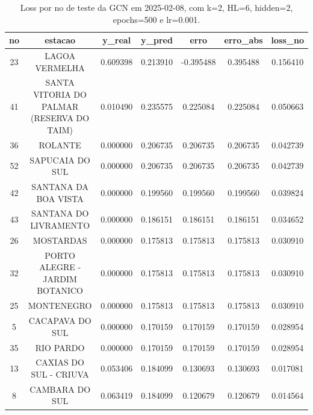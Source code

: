 \begin{table}[h]
\centering
\caption{Loss por no de teste da GCN em 2025-02-08, com k=2, HL=6, hidden=2, epochs=500 e lr=0.001.}
\label{tab:gcn_loss_k2_hl6_h2_e500_d20250208}
\begin{tabular}{ccccccc}
\toprule
no & estacao & y\_real & y\_pred & erro & erro\_abs & loss\_no \\
\midrule
23 & LAGOA VERMELHA & 0.609398 & 0.213910 & -0.395488 & 0.395488 & 0.156410 \\
41 & SANTA VITORIA DO PALMAR (RESERVA DO TAIM) & 0.010490 & 0.235575 & 0.225084 & 0.225084 & 0.050663 \\
36 & ROLANTE & 0.000000 & 0.206735 & 0.206735 & 0.206735 & 0.042739 \\
52 & SAPUCAIA DO SUL & 0.000000 & 0.206735 & 0.206735 & 0.206735 & 0.042739 \\
42 & SANTANA DA BOA VISTA & 0.000000 & 0.199560 & 0.199560 & 0.199560 & 0.039824 \\
43 & SANTANA DO LIVRAMENTO & 0.000000 & 0.186151 & 0.186151 & 0.186151 & 0.034652 \\
26 & MOSTARDAS & 0.000000 & 0.175813 & 0.175813 & 0.175813 & 0.030910 \\
32 & PORTO ALEGRE - JARDIM BOTANICO & 0.000000 & 0.175813 & 0.175813 & 0.175813 & 0.030910 \\
25 & MONTENEGRO & 0.000000 & 0.175813 & 0.175813 & 0.175813 & 0.030910 \\
5 & CACAPAVA DO SUL & 0.000000 & 0.170159 & 0.170159 & 0.170159 & 0.028954 \\
35 & RIO PARDO & 0.000000 & 0.170159 & 0.170159 & 0.170159 & 0.028954 \\
13 & CAXIAS DO SUL - CRIUVA & 0.053406 & 0.184099 & 0.130693 & 0.130693 & 0.017081 \\
8 & CAMBARA DO SUL & 0.063419 & 0.184099 & 0.120679 & 0.120679 & 0.014564 \\
\bottomrule
\end{tabular}
\end{table}
